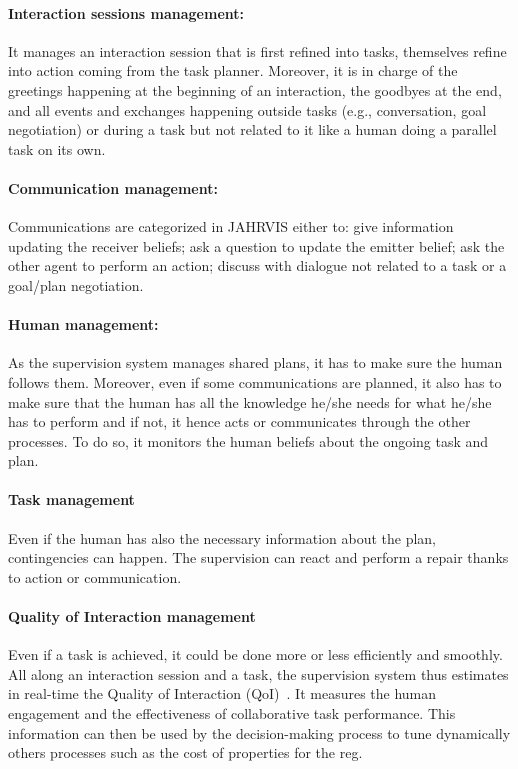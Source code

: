 \paragraph{Interaction sessions management:} It manages an interaction session that is first refined into tasks, themselves refine into action coming from the task planner. Moreover, it is in charge of the greetings happening at the beginning of an interaction, the goodbyes at the end, and all events and exchanges happening outside tasks (e.g., conversation, goal negotiation) or during a task but not related to it like a human doing a parallel task on its own.

\paragraph{Communication management:} Communications are categorized in JAHRVIS either to: give information updating the receiver beliefs; ask a question to update the emitter belief; ask the other agent to perform an action; discuss with dialogue not related to a task or a goal/plan negotiation. 

\paragraph{Human management:} As the supervision system manages shared plans, it has to make sure the human follows them. Moreover, even if some communications are planned, it also has to make sure that the human has all the knowledge he/she needs for what he/she has to perform and if not, it hence acts or communicates through the other processes. To do so, it monitors the human beliefs about the ongoing task and plan.

\paragraph{Task management} Even if the human has also the necessary information about the plan, contingencies can happen. The supervision can react and perform a repair thanks to action or communication.

\paragraph{Quality of Interaction management} Even if a task is achieved, it could be done more or less efficiently and smoothly. All along an interaction session and a task, the supervision system thus estimates in real-time the Quality of Interaction (QoI)~\cite{mayima_2020_toward}. It measures the human engagement and the effectiveness of collaborative task performance. This information can then be used by the decision-making process to tune dynamically others processes such as the cost of properties for the \acrshort{reg}.

